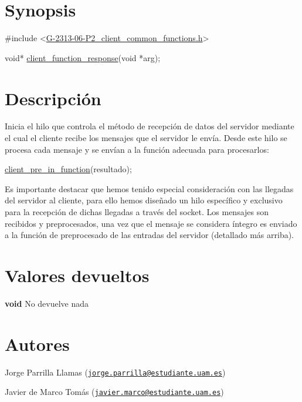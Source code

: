\hypertarget{client_function_response_synopsis_2}{}\section{Synopsis}\label{client_function_response_synopsis_2}

\begin{DoxyCode}
\textcolor{preprocessor}{#include <\hyperlink{G-2313-06-P2__client__common__functions_8h}{G-2313-06-P2\_client\_common\_functions.h}>}

\textcolor{keywordtype}{void}* \hyperlink{G-2313-06-P2__client_8h_afbd2dc7b3224fc3d2c5c9233b307c376}{client\_function\_response}(\textcolor{keywordtype}{void} *arg);
\end{DoxyCode}
 \hypertarget{client_function_response_descripcion_2}{}\section{Descripción}\label{client_function_response_descripcion_2}
Inicia el hilo que controla el método de recepción de datos del servidor mediante el cual el cliente recibe los mensajes que el servidor le envía. Desde este hilo se procesa cada mensaje y se envían a la función adecuada para procesarlos\+: 
\begin{DoxyCode}
\hyperlink{G-2313-06-P2__client_8h_aa74c686c447b275e6a8cf36419033e81}{client\_pre\_in\_function}(resultado);
\end{DoxyCode}
 Es importante destacar que hemos tenido especial consideración con las llegadas del servidor al cliente, para ello hemos diseñado un hilo específico y exclusivo para la recepción de dichas llegadas a través del socket. Los mensajes son recibidos y preprocesados, una vez que el mensaje se considera íntegro es enviado a la función de preprocesado de las entradas del servidor (detallado más arriba). \hypertarget{server_especial_recibir_ficheros_return_2}{}\section{Valores devueltos}\label{server_especial_recibir_ficheros_return_2}

\begin{DoxyItemize}
\item {\bfseries void} No devuelve nada 
\end{DoxyItemize}\hypertarget{client_function_response_authors_2}{}\section{Autores}\label{client_function_response_authors_2}

\begin{DoxyItemize}
\item Jorge Parrilla Llamas (\href{mailto:jorge.parrilla@estudiante.uam.es}{\tt jorge.\+parrilla@estudiante.\+uam.\+es}) 
\item Javier de Marco Tomás (\href{mailto:javier.marco@estudiante.uam.es}{\tt javier.\+marco@estudiante.\+uam.\+es}) 
\end{DoxyItemize}